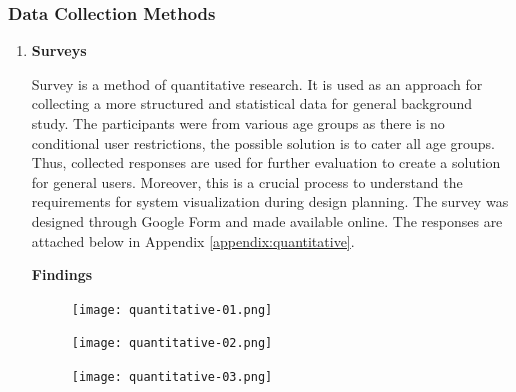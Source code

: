     \subsubsection{Data Collection Methods}
      \begin{enumerate}[1.]
        \item \textbf{Surveys}
          \par Survey is a method of quantitative research. It is used as an approach for collecting a more structured and statistical data for general background study. The participants were from various age groups as there is no conditional user restrictions, the possible solution is to cater all age groups.  Thus, collected responses are used for further evaluation to create a solution for general users. Moreover, this is a crucial process to understand the requirements for system visualization during design planning. The survey was designed through Google Form and made available online. The responses are attached below in Appendix \ref{appendix:quantitative}.
          \par \textbf{Findings}
            \begin{figure}[H]
              \centering
              \texttt{[image: quantitative-01.png]}
              \caption{}
              \label{fig:quantitative-01}
            \end{figure}
            \begin{figure}[H]
              \centering
              \texttt{[image: quantitative-02.png]}
              \caption{}
              \label{fig:quantitative-02}
            \end{figure}
            \begin{figure}[H]
              \centering
              \texttt{[image: quantitative-03.png]}
              \caption{}
              \label{fig:quantitative-03}
            \end{figure}


\end{enumerate}
